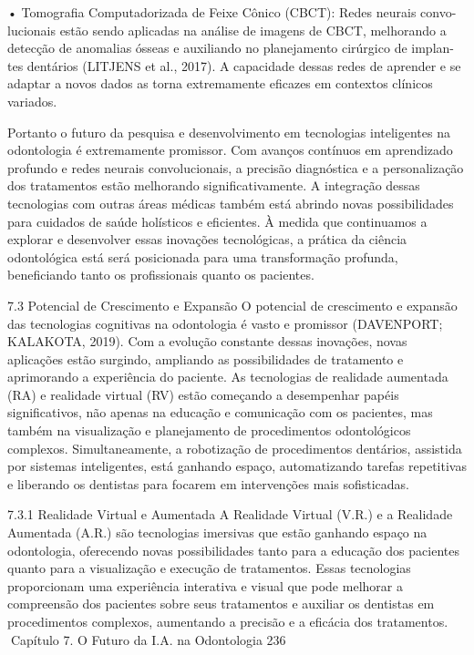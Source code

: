     • Tomografia Computadorizada de Feixe Cônico (CBCT): Redes neurais convo-
      lucionais estão sendo aplicadas na análise de imagens de CBCT, melhorando a
      detecção de anomalias ósseas e auxiliando no planejamento cirúrgico de implan-
      tes dentários (LITJENS et al., 2017). A capacidade dessas redes de aprender e
      se adaptar a novos dados as torna extremamente eficazes em contextos clínicos
      variados.

         Portanto o futuro da pesquisa e desenvolvimento em tecnologias inteligentes
na odontologia é extremamente promissor. Com avanços contínuos em aprendizado
profundo e redes neurais convolucionais, a precisão diagnóstica e a personalização
dos tratamentos estão melhorando significativamente. A integração dessas tecnologias
com outras áreas médicas também está abrindo novas possibilidades para cuidados de
saúde holísticos e eficientes. À medida que continuamos a explorar e desenvolver essas
inovações tecnológicas, a prática da ciência odontológica está será posicionada para
uma transformação profunda, beneficiando tanto os profissionais quanto os pacientes.


7.3     Potencial de Crescimento e Expansão
O potencial de crescimento e expansão das tecnologias cognitivas na odontologia é
vasto e promissor (DAVENPORT; KALAKOTA, 2019). Com a evolução constante dessas
inovações, novas aplicações estão surgindo, ampliando as possibilidades de tratamento
e aprimorando a experiência do paciente. As tecnologias de realidade aumentada (RA)
e realidade virtual (RV) estão começando a desempenhar papéis significativos, não
apenas na educação e comunicação com os pacientes, mas também na visualização
e planejamento de procedimentos odontológicos complexos. Simultaneamente, a
robotização de procedimentos dentários, assistida por sistemas inteligentes, está
ganhando espaço, automatizando tarefas repetitivas e liberando os dentistas para
focarem em intervenções mais sofisticadas.

7.3.1     Realidade Virtual e Aumentada
A Realidade Virtual (V.R.) e a Realidade Aumentada (A.R.) são tecnologias imersivas
que estão ganhando espaço na odontologia, oferecendo novas possibilidades tanto
para a educação dos pacientes quanto para a visualização e execução de tratamentos.
Essas tecnologias proporcionam uma experiência interativa e visual que pode melhorar
a compreensão dos pacientes sobre seus tratamentos e auxiliar os dentistas em
procedimentos complexos, aumentando a precisão e a eficácia dos tratamentos.
Capítulo 7. O Futuro da I.A. na Odontologia                                            236


